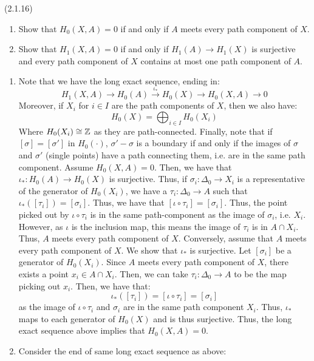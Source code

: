 \documentclass[12pt]{article}
\begin{document}
\begin{problem}{3}(2.1.16) 
\begin{enumerate}
    \item Show that $H_0(X,A) = 0$ if and only if $A$ meets every path component of $X$.
    \item Show that $H_1(X,A) = 0$ if and only if $H_1(A) \to H_1(X)$ is surjective and every path component of $X$ contains at most one path component of $A$.
\end{enumerate}     
\end{problem}
\begin{solution}
    \bbni 
    \begin{enumerate}
        \item Note that we have the long exact sequence, ending in:
        \[ H_1(X, A) \to H_0(A) \xrightarrow{\iota_*} H_0(X) \to H_0(X, A) \to 0 \]
        Moreover, if $X_i$ for $i \in I$ are the path components of $X$, then we also have: 
        \[ H_0(X) = \bigoplus_{i \in I} H_0(X_i) \]
        Where $H_0(X_i) \cong \mathbb Z$ as they are path-connected. Finally, note that if $[\sigma] = [\sigma']$ in $H_0(\cdot)$, $\sigma' - \sigma$ is a boundary if and only if the images of $\sigma$ and $\sigma'$ (single points) have a path connecting them, i.e. are in the same path component. \bbni
        Assume $H_0(X, A) = 0$. Then, we have that $\iota_*: H_0(A) \to H_0(X)$ is surjective. Thus, if $\sigma_i: \Delta_0 \to X_i$ is a representative of the generator of $H_0(X_i)$, we have a $\tau_i: \Delta_0 \to A$ such that $\iota_*([\tau_i]) = [\sigma_i]$. Thus, we have that $[\iota \circ \tau_i] = [\sigma_i]$. Thus, the point picked out by $\iota \circ \tau_i$ is in the same path-component as the image of $\sigma_i$, i.e. $X_i$. However, as $\iota$ is the inclusion map, this means the image of $\tau_i$ is in $A \cap X_i$. Thus, $A$ meets every path component of $X$. \bbni
        Conversely, assume that $A$ meets every path component of $X$. We show that $\iota_*$ is surjective. Let $[\sigma_i]$ be a generator of $H_0(X_i)$. Since $A$ meets every path component of $X$, there exists a point $x_i \in A \cap X_i$. Then, we can take $\tau_i: \Delta_0 \to A$ to be the map picking out $x_i$. Then, we have that: 
        \[ \iota_*([\tau_i]) = [\iota \circ \tau_i] = [\sigma_i]\]
        as the image of $\iota \circ \tau_i$ and $\sigma_i$ are in the same path component $X_i$. Thus, $\iota_*$ maps to each generator of $H_0(X)$ and is thus surjective. Thus, the long exact sequence above implies that $H_0(X, A) = 0$. 
        \item Consider the end of same long exact sequence as above: 

\end{enumerate}
\end{solution}
\end{document}

